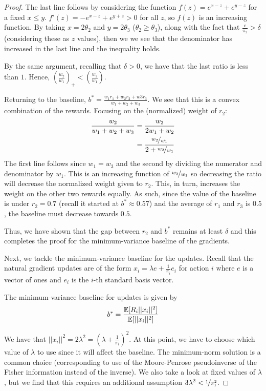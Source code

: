 \begin{proof}
The last line follows by considering the function 
$f(z) = e^{x-z} + e^{y-z}$ for a fixed $x \le y$.
$f'(z) = -e^{x-z} + e^{y+z} > 0$ for all $z$, so $f(z)$ is an increasing function.
By taking $x = 2\theta_2 $ and $y = 2\theta_3$ ($\theta_2 \ge \theta_3$), along with the fact that $\frac{c}{\pi_2} > \delta$ (considering these as $z$ values), then we we see that the denominator has increased in the last line and the inequality holds.

By the same argument, recalling that $\delta > 0$, we have that the last ratio is less than $1$. Hence, $\left(\frac{w_2}{w_1}\right)_+ < \left(\frac{w_2}{w_1}\right)$. 

Returning to the baseline, $b^* = \frac{w_1 r_1 + w_2 r_2 + w3 r_3}{w_1 + w_2 + w_3} $. We see that this is a convex combination of the rewards. 
Focusing on the (normalized) weight of $r_2$:
\begin{align*}
    \frac{w_2}{w_1 + w_2 + w_3} &= \frac{w_2}{2w_1 + w_2} \\
    &= \frac{\nicefrac{w_2}{w_1}}{2 + \nicefrac{w_2}{w_1}}
\end{align*}
The first line follows since $w_1 = w_3$ and the second by dividing the numerator and denominator by $w_1$.
This is an increasing function of $\nicefrac{w_2}{w_1}$ so decreasing the ratio will decrease the normalized weight given to $r_2$.
This, in turn, increases the weight on the other two rewards equally. 
As such, since the value of the baseline is under $r_2 = 0.7$ (recall it started at $b^* \approx 0.57$) and the average of $r_1$ and $r_3$ is $0.5$, the baseline must decrease towards $0.5$.

Thus, we have shown that the gap between $r_2$ and $b^*$ remains at least $\delta$ and this completes the proof for the minimum-variance baseline of the gradients.

Next, we tackle the minimum-variance baseline for the updates.
Recall that the natural gradient updates are of the form 
$x_i = \lambda e + \frac{1}{\pi_i} e_i$ for action $i$ where $e$ is a vector of ones and $e_i$ is the $i$-th standard basis vector.

The minimum-variance baseline for updates is given by
\[b^* = \frac{\mathbb{E} [R_i ||x_i||^2 ] }{\mathbb{E} [||x_i||^2]  }\]

We have that $||x_i||^2 = 2\lambda^2 = (\lambda + \frac{1}{\pi_i})^2$.  
At this point, we have to choose which value of $\lambda$ to use since it will affect the baseline.
The minimum-norm solution is a common choice (corresponding to use of the Moore-Penrose pseudoinverse of the Fisher information instead of the inverse). We also take a look at fixed values of $\lambda$, but we find that this requires an additional assumption $3\lambda^2 < \nicefrac{1}{\pi_1^2}$.


\end{proof}
